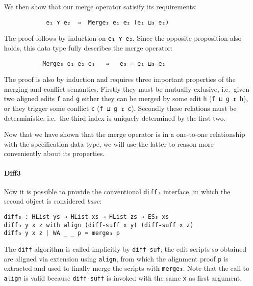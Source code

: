 \documentclass[preprint]{sigplanconf}
\begin{document}
        We then show that our merge operator satisify its requirements:
\begin{verbatim}
            e₁ ⋎ e₂  ⇒  Merge₃ e₁ e₂ (e₁ ⊔₃ e₂)
\end{verbatim}
        The proof follows by induction on \texttt{e₁ ⋎ e₂}. Since the opposite
        proposition also holds, this data type fully describes the merge operator:
\begin{verbatim}
           Merge₃ e₁ e₂ e₃   ⇒   e₃ ≡ e₁ ⊔₃ e₂
\end{verbatim}
        The proof is also by induction and requires three important properties of
        the merging and conflict semantics.
        Firstly they must be mutually exlusive, i.e.\ given
        two aligned edits \texttt{f} and \texttt{g} either they can be merged by
        some edit \texttt{h} (\texttt{f ⊔ g ↧ h}), or they trigger some conflict
        \texttt{c} (\texttt{f ⊔ g ↥ c}). Secondly these relations must be deterministic, i.e.\
        the third index is uniquely determined by the first two.
        
        Now that we have shown that the merge operator is in a one-to-one 
        relationship with the specification data type, we will use the latter
        to reason more conveniently about its properties.

	\paragraph{Diff3}
	Now it is possible to provide the conventional \texttt{diff₃} interface, in
	which the second object is considered \emph{base}:
\begin{verbatim}
diff₃ : HList ys → HList xs → HList zs → ES₃ xs
diff₃ y x z with align (diff-suff x y) (diff-suff x z)
diff₃ y x z | WA _ _ p = merge₃ p
\end{verbatim}
	
	The \texttt{diff} algorithm is called implicitly by
        \texttt{diff-suf}; the edit scripts so obtained are aligned
        via extension using \texttt{align}, from which the alignment
        proof \texttt{p} is extracted and used to finally merge the
        scripts with \texttt{merge₃}.  Note that the call to
        \texttt{align} is valid because \texttt{diff-suff} is invoked
        with the same \texttt{x} as first argument.
\end{document}
